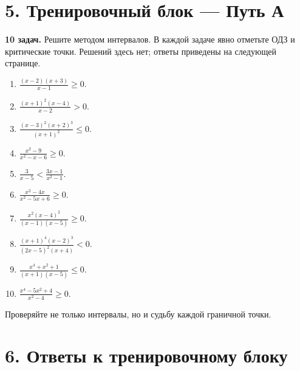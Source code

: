 \documentclass[a4paper,12pt]{article}
\begin{document}
\section*{5. Тренировочный блок — Путь А}
\textbf{10 задач.} Решите методом интервалов. В каждой задаче явно отметьте ОДЗ и критические точки. Решений здесь нет; ответы приведены на следующей странице.

\begin{enumerate}
  \item \(\displaystyle \frac{(x-2)(x+3)}{x-1}\ge0.\)

  \item \(\displaystyle \frac{(x+1)^2(x-4)}{x-2}>0.\)

  \item \(\displaystyle \frac{(x-3)^2(x+2)^3}{(x+1)^2}\le0.\)

  \item \(\displaystyle \frac{x^2-9}{x^2-x-6}\ge0.\)

  \item \(\displaystyle \frac{3}{x-5}<\frac{3x-1}{x^2-1}.\)

  \item \(\displaystyle \frac{x^2-4x}{x^2-5x+6}\ge0.\)

  \item \(\displaystyle \frac{x^2(x-4)^2}{(x-1)(x-5)}\ge0.\)

  \item \(\displaystyle \frac{(x+1)^4(x-2)^3}{(2x-5)^2(x+4)}<0.\)

  \item \(\displaystyle \frac{x^4+x^2+1}{(x+1)(x-5)}\le0.\)

  \item \(\displaystyle \frac{x^4-5x^2+4}{x^2-4}\ge0.\)
\end{enumerate}

\vfill
\begin{center}
\small\color{muted}
Проверяйте не только интервалы, но и судьбу каждой граничной точки.
\end{center}
\clearpage

\section*{6. Ответы к тренировочному блоку}
\end{document}
